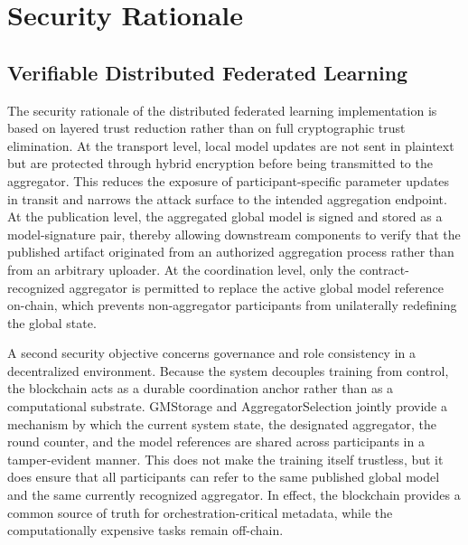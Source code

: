 \chapter{Security Rationale}
\label{cha:chapter4}

\section{Verifiable Distributed Federated Learning}

The security rationale of the distributed federated learning implementation is based on layered trust reduction rather than on full cryptographic trust elimination. At the transport level, local model updates are not sent in plaintext but are protected through hybrid encryption before being transmitted to the aggregator. This reduces the exposure of participant-specific parameter updates in transit and narrows the attack surface to the intended aggregation endpoint. At the publication level, the aggregated global model is signed and stored as a model-signature pair, thereby allowing downstream components to verify that the published artifact originated from an authorized aggregation process rather than from an arbitrary uploader. At the coordination level, only the contract-recognized aggregator is permitted to replace the active global model reference on-chain, which prevents non-aggregator participants from unilaterally redefining the global state.

A second security objective concerns governance and role consistency in a decentralized environment. Because the system decouples training from control, the blockchain acts as a durable coordination anchor rather than as a computational substrate. GMStorage and AggregatorSelection jointly provide a mechanism by which the current system state, the designated aggregator, the round counter, and the model references are shared across participants in a tamper-evident manner. This does not make the training itself trustless, but it does ensure that all participants can refer to the same published global model and the same currently recognized aggregator. In effect, the blockchain provides a common source of truth for orchestration-critical metadata, while the computationally expensive tasks remain off-chain.

